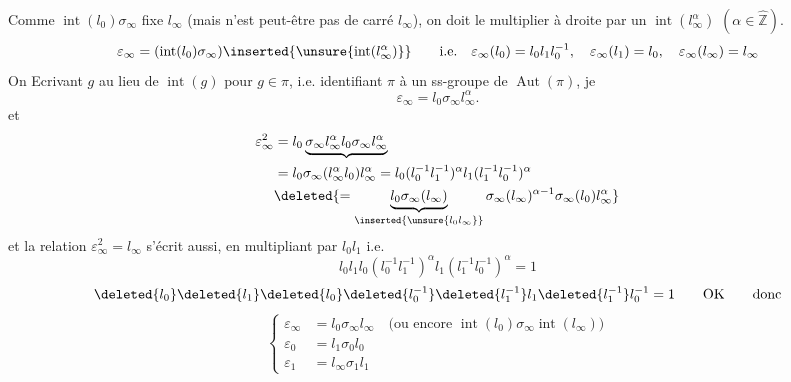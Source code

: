 Comme $\operatorname{int}(l_0)\sigma_\infty$ fixe $l_\infty$ (mais n'est peut-être pas de carré $l_\infty$), on doit le multiplier à droite par un $\operatorname{int}(l_\infty^\alpha)$ $(\alpha\in\widehat{\mathbb Z})$.
\deleted{\[
\varepsilon_\infty(l_\infty)=l_\infty,\qquad\varepsilon_\infty(l_0)=
\]}
\[
\varepsilon_\infty=(\operatorname{int}(l_0)\sigma_\infty)\inserted{\unsure{\operatorname{int}(l_\infty^\alpha)}}\qquad\text{i.e.}\quad
\varepsilon_\infty(l_0)=l_0l_1l_0^{-1},\quad\varepsilon_\infty(l_1)=l_0,\quad\varepsilon_\infty(l_\infty)=l_\infty
\]
On   Ecrivant $g$ au lieu de $\operatorname{int}(g)$ pour $g\in\pi$, i.e. identifiant $\pi$ à un ss-groupe de $\operatorname{Aut}(\pi)$, je  
\[
\varepsilon_\infty=l_0\sigma_\infty l_\infty^\alpha.
\]
\deleted{\[
\varepsilon_\infty^2=l_0\sigma_\infty l_0\sigma_\infty
=l_0\sigma_\infty l_0\sigma_\infty^{-1}=l_0\sigma_\infty(l_0)
\]}
et
\[
\begin{aligned}
\varepsilon_\infty^2&=l_0\underbrace{\sigma_\infty l_\infty^\alpha l_0\sigma_\infty l_\infty^\alpha}\\
&=l_0\sigma_\infty(l_\infty^\alpha l_0)l_\infty^\alpha
=l_0(l_0^{-1}l_1^{-1})^\alpha l_1(l_1^{-1}l_0^{-1})^\alpha\\
&\deleted{=\underbrace{l_0\sigma_\infty(l_\infty)}_{\inserted{\unsure{l_0l_\infty}}}\sigma_\infty(l_\infty)^{\alpha-1}\sigma_\infty(l_0)l_\infty^\alpha}
\end{aligned}
\]
et la relation $\varepsilon_\infty^2=l_\infty$  s'écrit aussi, en multipliant par $l_0l_1$
\deleted{\[
l_0l_\infty\underbrace{\sigma_\infty(l_\infty)^{\alpha-1}}_{(l_0^{-1}l_1^{-1})^{\alpha-1}}\underbrace{\sigma_\infty(l_0)}_{l_1}l_\infty^{\alpha-1}=1
\]}
i.e.
\deleted{\[
\deleted{\unsure{l_\infty^{-1}l_\infty}}l_0^{1-\alpha}l_1^{2-\alpha}l_\infty^\alpha=1
\]}
\[
l_0l_1l_0(l_0^{-1}l_1^{-1})^\alpha l_1(l_1^{-1}l_0^{-1})^\alpha=1
\]
\deleted{\[
l_0l_1l_0l_0^{-1}l_1^{-1}l_0^{-1}l_1^{-1}l_1l_1l_0^{-1}l_1^{-1}l_0^{-1}=1?\qquad\text{Non !}
\]}
\[
\deleted{l_0}\deleted{l_1}\deleted{l_0}\deleted{l_0^{-1}}\deleted{l_1^{-1}}l_1\deleted{l_1^{-1}}l_0^{-1}=1
\qquad\text{OK}\qquad\text{donc}
\]
\[
\left\{\begin{aligned}
\varepsilon_\infty&=l_0\sigma_\infty l_\infty\quad\text{(ou encore }\operatorname{int}(l_0)\sigma_\infty\operatorname{int}(l_\infty)\text{)}\\
\varepsilon_0&=l_1\sigma_0l_0\\
\varepsilon_1&=l_\infty\sigma_1l_1
\end{aligned}\right.
\]


